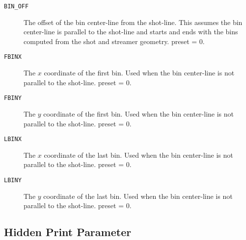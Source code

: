 \begin{description}
\item[\texttt{BIN\_OFF}] The offset of the bin center-line from the shot-line.  This assumes the bin center-line is parallel to the shot-line and starts and ends with the bins computed from the \gls{shot} and streamer geometry.  \Gls{preset} = 0.
\item[\texttt{FBINX}] The $x$ coordinate of the first bin.  Used when the bin center-line is not parallel to the shot-line.  \Gls{preset} = 0.
\item[\texttt{FBINY}] The $y$ coordinate of the first bin.  Used when the bin center-line is not parallel to the shot-line.  \Gls{preset} = 0.
\item[\texttt{LBINX}] The $x$ coordinate of the last bin.  Used when the bin center-line is not parallel to the shot-line.  \Gls{preset} = 0.
\item[\texttt{LBINY}] The $y$ coordinate of the last bin.  Used when the bin center-line is not parallel to the shot-line.  \Gls{preset} = 0.
\end{description}

\subsection{Hidden Print Parameter}

